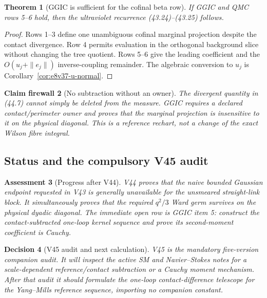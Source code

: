\documentclass[11pt,oneside]{book}
\newtheorem{theorem}{Theorem}[chapter]
\newtheorem{assessment}[theorem]{Assessment}
\newtheorem{firewall}[theorem]{Claim firewall}
\newtheorem{decision}[theorem]{Decision}
\theoremstyle{definition}
\theoremstyle{remark}
\begin{document}
\begin{theorem}[GGIC is sufficient for the cofinal beta row]
\label{thm:e8v44-GGIC}
If GGIC and QMC rows 5--6 hold, then the ultraviolet recurrence
(43.24)--(43.25) follows.
\end{theorem}

\begin{proof}
Rows 1--3 define one unambiguous cofinal marginal projection despite
the contact divergence.  Row 4 permits evaluation in the orthogonal
background slice without changing the tree quotient.  Rows 5--6
give the leading coefficient and the
\(O(u_j+\|e_j\|)\) inverse-coupling remainder.  The algebraic
conversion to \(u_j\) is
Corollary~\ref{cor:e8v37-u-normal}.
\end{proof}

\begin{firewall}[No subtraction without an owner]
\label{fire:e8v44-no-free-subtraction}
The divergent quantity in (44.7) cannot simply be deleted from the
measure.  GGIC requires a declared contact/perimeter owner and proves
that the marginal projection is insensitive to it on the physical
diagonal.  This is a reference rechart, not a change of the exact
Wilson fibre integral.
\end{firewall}

\subsection{Status and the compulsory V45 audit}

\begin{assessment}[Progress after V44]
\label{ass:e8v44-status}
V44 proves that the naive bounded Gaussian endpoint requested in V43
is generally unavailable for the unsmeared straight-link block.
It simultaneously proves that the required \(q^2/3\) Ward germ
survives on the physical dyadic diagonal.  The immediate open row is
GGIC item 5: construct the contact-subtracted one-loop kernel sequence
and prove its second-moment coefficient is Cauchy.
\end{assessment}

\begin{decision}[V45 audit and next calculation]
\label{dec:e8v44-next}
V45 is the mandatory five-version companion audit.  It will inspect
the active SM and Navier--Stokes notes for a scale-dependent
reference/contact subtraction or a Cauchy moment mechanism.  After
that audit it should formulate the one-loop contact-difference
telescope for the Yang--Mills reference sequence, importing no
companion constant.
\end{decision}
\end{document}
